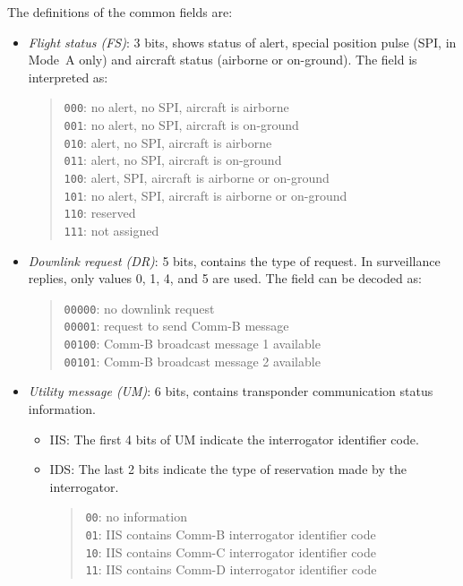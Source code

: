 The definitions of the common fields are:

\begin{itemize}
  \item \emph{Flight status (FS)}: 3 bits, shows status of alert, special position pulse (SPI, in Mode~A only) and aircraft status (airborne or on-ground). The field is interpreted as:

  \begin{quote}
    \small
    \texttt{000}: no alert, no SPI, aircraft is airborne \\
    \texttt{001}: no alert, no SPI, aircraft is on-ground \\
    \texttt{010}: alert, no SPI, aircraft is airborne \\
    \texttt{011}: alert, no SPI, aircraft is on-ground \\
    \texttt{100}: alert, SPI, aircraft is airborne or on-ground \\
    \texttt{101}: no alert, SPI, aircraft is airborne or on-ground \\
    \texttt{110}: reserved \\
    \texttt{111}: not assigned
  \end{quote}

  \item \emph{Downlink request (DR)}: 5 bits, contains the type of request. In surveillance replies, only values 0, 1, 4, and 5 are used. The field can be decoded as:

  \begin{quote}
    \small
    \texttt{00000}: no downlink request \\
    \texttt{00001}: request to send Comm-B message \\
    \texttt{00100}: Comm-B broadcast message 1 available \\
    \texttt{00101}: Comm-B broadcast message 2 available
  \end{quote}

  \item \emph{Utility message (UM)}: 6 bits, contains transponder communication status information. 
  
  \begin{itemize}
    \item IIS: The first 4 bits of UM indicate the interrogator identifier code. 
    \item IDS: The last 2 bits indicate the type of reservation made by the interrogator.

    \begin{quote}
      \small
      \texttt{00}: no information \\
      \texttt{01}: IIS contains Comm-B interrogator identifier code \\
      \texttt{10}: IIS contains Comm-C interrogator identifier code \\
      \texttt{11}: IIS contains Comm-D interrogator identifier code \\
    \end{quote}
  
  \end{itemize}

  


\end{itemize}
